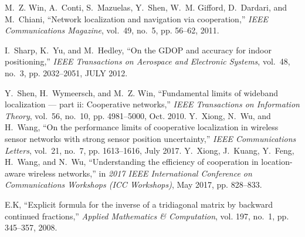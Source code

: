 \documentclass[conference]{IEEEtran}
\begin{document}
\begin{thebibliography}{1}
M.~Z. Win, A.~Conti, S.~Mazuelas, Y.~Shen, W.~M. Gifford, D.~Dardari, and
  M.~Chiani, ``Network localization and navigation via cooperation,''
  \emph{IEEE Communications Magazine}, vol.~49, no.~5, pp. 56--62, 2011.

I.~Sharp, K.~Yu, and M.~Hedley, ``On the GDOP and accuracy for indoor
  positioning,'' \emph{IEEE Transactions on Aerospace and Electronic Systems},
  vol.~48, no.~3, pp. 2032--2051, JULY 2012.

Y.~Shen, H.~Wymeersch, and M.~Z. Win, ``Fundamental limits of wideband
  localization --- part ii: Cooperative networks,'' \emph{IEEE Transactions
  on Information Theory}, vol.~56, no.~10, pp. 4981--5000, Oct. 2010.
Y.~Xiong, N.~Wu, and H.~Wang, ``On the performance limits of cooperative
  localization in wireless sensor networks with strong sensor position
  uncertainty,'' \emph{IEEE Communications Letters}, vol.~21, no.~7, pp.
  1613--1616, July 2017.
Y.~Xiong, J.~Kuang, Y.~Feng, H.~Wang, and N.~Wu, ``Understanding the efficiency
  of cooperation in location-aware wireless networks,'' in \emph{2017 IEEE
  International Conference on Communications Workshops (ICC Workshops)}, May
  2017, pp. 828--833.


E.K, ``Explicit formula for the inverse of a tridiagonal matrix by
  backward continued fractions,'' \emph{Applied Mathematics \& Computation},
  vol. 197, no.~1, pp. 345--357, 2008.

\end{thebibliography}
\end{document}
